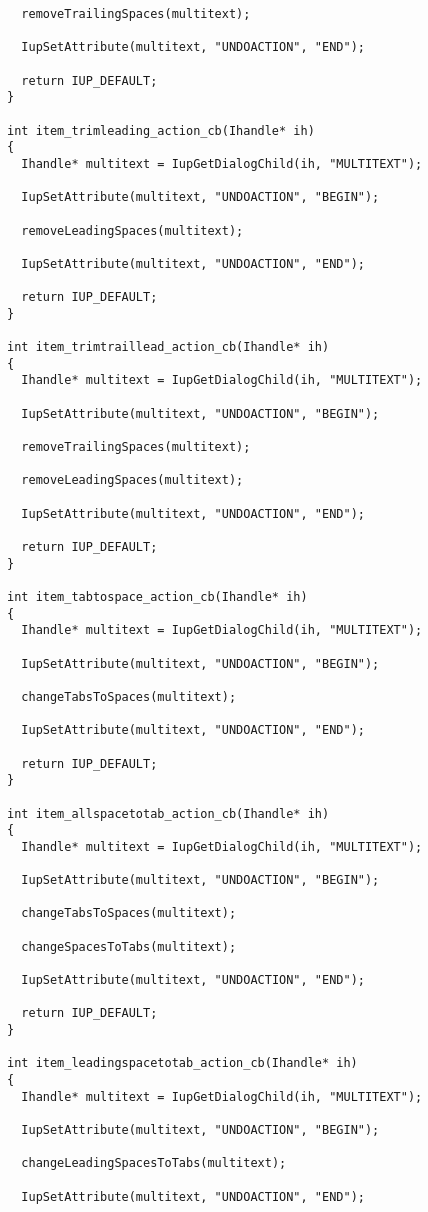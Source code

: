 \documentclass{ctexart}
\begin{document}
\begin{lstlisting}
  removeTrailingSpaces(multitext);

  IupSetAttribute(multitext, "UNDOACTION", "END");

  return IUP_DEFAULT;
}

int item_trimleading_action_cb(Ihandle* ih)
{
  Ihandle* multitext = IupGetDialogChild(ih, "MULTITEXT");

  IupSetAttribute(multitext, "UNDOACTION", "BEGIN");

  removeLeadingSpaces(multitext);

  IupSetAttribute(multitext, "UNDOACTION", "END");

  return IUP_DEFAULT;
}

int item_trimtraillead_action_cb(Ihandle* ih)
{
  Ihandle* multitext = IupGetDialogChild(ih, "MULTITEXT");

  IupSetAttribute(multitext, "UNDOACTION", "BEGIN");

  removeTrailingSpaces(multitext);

  removeLeadingSpaces(multitext);

  IupSetAttribute(multitext, "UNDOACTION", "END");

  return IUP_DEFAULT;
}

int item_tabtospace_action_cb(Ihandle* ih)
{
  Ihandle* multitext = IupGetDialogChild(ih, "MULTITEXT");

  IupSetAttribute(multitext, "UNDOACTION", "BEGIN");

  changeTabsToSpaces(multitext);

  IupSetAttribute(multitext, "UNDOACTION", "END");

  return IUP_DEFAULT;
}

int item_allspacetotab_action_cb(Ihandle* ih)
{
  Ihandle* multitext = IupGetDialogChild(ih, "MULTITEXT");

  IupSetAttribute(multitext, "UNDOACTION", "BEGIN");

  changeTabsToSpaces(multitext);

  changeSpacesToTabs(multitext);

  IupSetAttribute(multitext, "UNDOACTION", "END");

  return IUP_DEFAULT;
}

int item_leadingspacetotab_action_cb(Ihandle* ih)
{
  Ihandle* multitext = IupGetDialogChild(ih, "MULTITEXT");

  IupSetAttribute(multitext, "UNDOACTION", "BEGIN");

  changeLeadingSpacesToTabs(multitext);

  IupSetAttribute(multitext, "UNDOACTION", "END");


\end{lstlisting}
\end{document}
